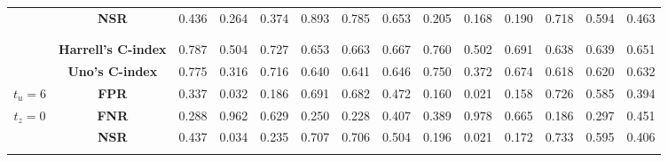\begin{table}[!htbp]
\begin{tabular}{c|c|cccccc|cccccc}
 & {\bf NSR} & 0.436 & 0.264 & 0.374 & 0.893 & 0.785 & 0.653 & 0.205 & 0.168 & 0.190 & 0.718 & 0.594 & 0.463 \\
& & & & & & & & & & & & & \\
\hline
& & & & & & & & & & & & & \\
 & {\bf Harrell’s C-index} & 0.787 & 0.504 & 0.727 & 0.653 & 0.663 & 0.667 & 0.760 & 0.502 & 0.691 & 0.638 & 0.639 & 0.651 \\
 & {\bf Uno's C-index} & 0.775 & 0.316 & 0.716 & 0.640 & 0.641 & 0.646 & 0.750 & 0.372 & 0.674 & 0.618 & 0.620 & 0.632 \\
$t_u=6$ & {\bf FPR} & 0.337 & 0.032 & 0.186 & 0.691 & 0.682 & 0.472 & 0.160 & 0.021 & 0.158 & 0.726 & 0.585 & 0.394 \\
$t_z=0$ & {\bf FNR} & 0.288 & 0.962 & 0.629 & 0.250 & 0.228 & 0.407 & 0.389 & 0.978 & 0.665 & 0.186 & 0.297 & 0.451 \\
 & {\bf NSR} & 0.437 & 0.034 & 0.235 & 0.707 & 0.706 & 0.504 & 0.196 & 0.021 & 0.172 & 0.733 & 0.595 & 0.406 \\
& & & & & & & & & & & & & \\
\hline
\end{tabular}
\end{table}
